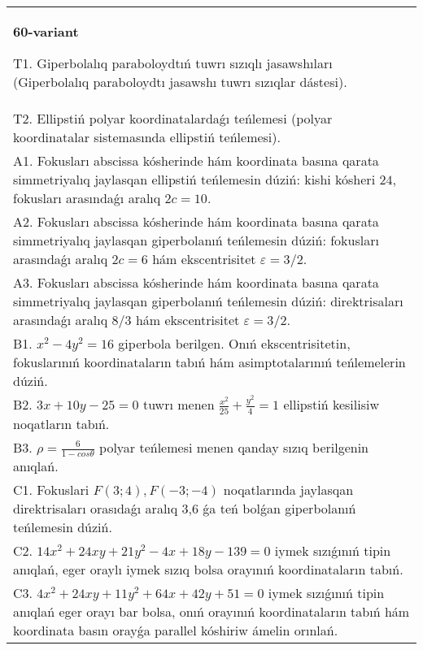 \documentclass{article}
\begin{document}
\begin{tabular}{m{17cm}}
\textbf{60-variant}
\newline

T1. Giperbolalıq paraboloydtıń tuwrı sızıqlı jasawshıları (Giperbolalıq paraboloydtı jasawshı tuwrı sızıqlar dástesi).\\

T2. Ellipstiń polyar koordinatalardaǵı teńlemesi (polyar koordinatalar sistemasında ellipstiń teńlemesi).\\

A1. Fokusları abscissa kósherinde hám koordinata basına qarata simmetriyalıq jaylasqan ellipstiń teńlemesin dúziń: kishi kósheri $24$, fokusları arasındaǵı aralıq $2 c=10$.\\

A2. Fokusları abscissa kósherinde hám koordinata basına qarata simmetriyalıq jaylasqan giperbolanıń teńlemesin dúziń: fokusları arasındaǵı aralıq $2 c=6$ hám ekscentrisitet $\varepsilon=3/2$.\\

A3. Fokusları abscissa kósherinde hám koordinata basına qarata simmetriyalıq jaylasqan giperbolanıń teńlemesin dúziń: direktrisaları arasındaǵı aralıq $8/3$ hám ekscentrisitet $\varepsilon=3/2$.\\

B1. $x^{2} - 4y^{2} = 16$ giperbola berilgen. Onıń ekscentrisitetin, fokuslarınıń koordinataların tabıń hám asimptotalarınıń teńlemelerin dúziń.\\

B2. $3x + 10y - 25 = 0$ tuwrı menen $\frac{x^{2}}{25} + \frac{y^{2}}{4} = 1$ ellipstiń kesilisiw noqatların tabıń.\\

B3. $\rho = \frac{6}{1 - cos\theta}$ polyar teńlemesi menen qanday sızıq berilgenin anıqlań.  \\

C1. Fokuslari $F(3;4), F(-3;-4)$ noqatlarında jaylasqan direktrisaları orasıdaǵı aralıq 3,6 ǵa teń bolǵan giperbolanıń teńlemesin dúziń.  \\

C2. $14x^{2} + 24xy + 21y^{2} - 4x + 18y - 139 = 0$ iymek sızıǵınıń tipin anıqlań, eger oraylı iymek sızıq bolsa orayınıń koordinataların tabıń.  \\

C3. $4x^{2} + 24xy + 11y^{2} + 64x + 42y + 51 = 0$ iymek sızıǵınıń tipin anıqlań eger orayı bar bolsa, onıń orayınıń koordinataların tabıń hám koordinata basın orayǵa parallel kóshiriw ámelin orınlań.  \\

\end{tabular}
\vspace{1cm}
\end{document}
